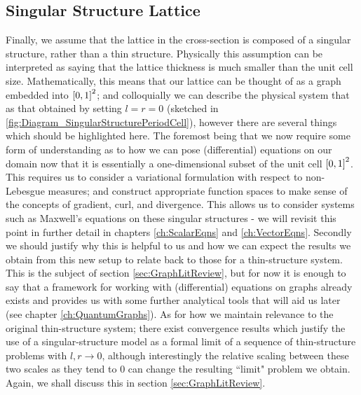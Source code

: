 \subsection{Singular Structure Lattice} \label{sec:ModellingAssumption3}
Finally, we assume that the lattice in the cross-section is composed of a singular structure, rather than a thin structure.
Physically this assumption can be interpreted as saying that the lattice thickness is much smaller than the unit cell size.
Mathematically, this means that our lattice can be thought of as a graph embedded into $\left[ 0,1 \right]^2$; and colloquially we can describe the physical system that as that obtained by setting $l=r=0$ (sketched in \ref{fig:Diagram_SingularStructurePeriodCell}), however there are several things which should be highlighted here.
The foremost being that we now require some form of understanding as to how we can pose (differential) equations on our domain now that it is essentially a one-dimensional subset of the unit cell $\left[ 0,1 \right]^2$.
This requires us to consider a variational formulation with respect to non-Lebesgue measures; and construct appropriate function spaces to make sense of the concepts of gradient, curl, and divergence.
This allows us to consider systems such as Maxwell's equations on these singular structures - we will revisit this point in further detail in chapters \ref{ch:ScalarEqns} and \ref{ch:VectorEqns}.
Secondly we should justify why this is helpful to us and how we can expect the results we obtain from this new setup to relate back to those for a thin-structure system.
This is the subject of section \ref{sec:GraphLitReview}, but for now it is enough to say that a framework for working with (differential) equations on graphs already exists and provides us with some further analytical tools that will aid us later (see chapter \ref{ch:QuantumGraphs}).
As for how we maintain relevance to the original thin-structure system; there exist convergence results which justify the use of a singular-structure model as a formal limit of a sequence of thin-structure problems with $l,r\rightarrow0$, although interestingly the relative scaling between these two scales as they tend to 0 can change the resulting ``limit" problem we obtain.
Again, we shall discuss this in section \ref{sec:GraphLitReview}.

